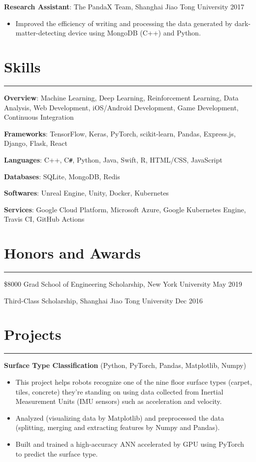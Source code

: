 \documentclass{article}
\begin{document}
\textbf{Research Assistant}: The PandaX Team, Shanghai Jiao Tong University \hfill
2017

\begin{itemize}[nosep]
	\item Improved the efficiency of writing and processing the data generated by dark-matter-detecting device using
	MongoDB (C++) and Python.
\end{itemize}

\section{Skills}
\hrule
\vspace{1em}

\textbf{Overview}: Machine Learning, Deep Learning, Reinforcement Learning, Data Analysis, Web Development,
iOS/Android Development, Game Development, Continuous Integration

\textbf{Frameworks}: TensorFlow, Keras, PyTorch, scikit-learn, Pandas, Express.js, Django, Flask, React

\textbf{Languages}: C++, C\texttt{\#}, Python, Java, Swift, R, HTML/CSS, JavaScript

\textbf{Databases}: SQLite, MongoDB, Redis

\textbf{Softwares}: Unreal Engine, Unity, Docker, Kubernetes

\textbf{Services}: Google Cloud Platform, Microsoft Azure, Google Kubernetes Engine, Travis CI, GitHub Actions

\section{Honors and Awards}
\hrule
\vspace{1em}

\$8000 Grad School of Engineering Scholarship, New York University \hfill
May 2019

Third-Class Scholarship, Shanghai Jiao Tong University \hfill
Dec 2016

\section{Projects}
\hrule
\vspace{1em}

\textbf{Surface Type Classification} (Python, PyTorch, Pandas, Matplotlib, Numpy)

\begin{itemize}[nosep]
	\item This project helps robots recognize one of the nine floor surface types (carpet, tiles, concrete) they’re standing
	on using data collected from Inertial Measurement Units (IMU sensors) such as
	acceleration and velocity.
	\item Analyzed (visualizing data by Matplotlib) and preprocessed the data (splitting, merging and extracting features by
	Numpy and Pandas).
	\item Built and trained a high-accuracy ANN accelerated by GPU using PyTorch to predict the
	surface type.
\end{itemize}
\end{document}
